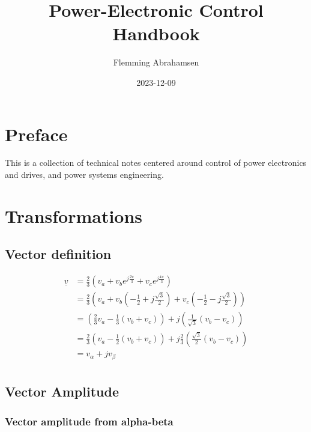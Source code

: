 \documentclass[]{book}
\title{Power-Electronic Control Handbook}
\author{Flemming Abrahamsen}
\date{2023-12-09}
\begin{document}
\maketitle

{
\setcounter{tocdepth}{1}
\tableofcontents
}
\hypertarget{preface}{%
\chapter{Preface}\label{preface}}

This is a collection of technical notes centered around control of power electronics and drives, and power systems engineering.

\hypertarget{transformations}{%
\chapter{Transformations}\label{transformations}}

\hypertarget{vector-definition}{%
\section{Vector definition}\label{vector-definition}}

\[
\begin{aligned}
\underline{v} 
& = \frac{2}{3} \left( v_a + v_b e^{j \frac{2 \pi}{3}}+ v_c e^{j \frac{4 \pi}{3}} \right)\\
& = \frac{2}{3} \left( v_a + v_b (- \frac{1}{2}+j\frac{\sqrt{3}}{2}) + v_c (- \frac{1}{2}-j\frac{\sqrt{3}}{2}) \right)\\
& = \left(\frac{2}{3} v_a - \frac{1}{3}  (v_b+v_c) \right) + j \left( \frac{1}{\sqrt{3}} (v_b-v_c) \right)   \\
& = \frac{2}{3} \left( v_a - \frac{1}{2}  (v_b+v_c) \right) + j \frac{2}{3} \left( \frac{\sqrt{3}}{2} (v_b-v_c) \right)   \\
& = v_\alpha + j v_\beta   \\
\end{aligned}
\label{eq:trans1}
\]

\hypertarget{vector-amplitude}{%
\section{Vector Amplitude}\label{vector-amplitude}}

\hypertarget{vector-amplitude-from-alpha-beta}{%
\subsection{Vector amplitude from alpha-beta}\label{vector-amplitude-from-alpha-beta}}
\end{document}
